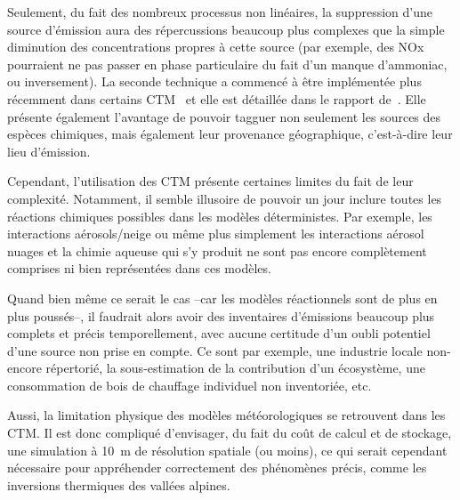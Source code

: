 Seulement, du fait des nombreux processus non linéaires, la suppression d'une source
d'émission aura des répercussions beaucoup plus complexes que la simple diminution des
concentrations propres à cette source (par exemple, des NOx pourraient ne pas passer en
phase particulaire du fait d'un manque d'ammoniac, ou inversement). 
La seconde technique a commencé à être implémentée plus récemment dans certains
CTM~\autocite{wangDevelopment2009,wagstromDevelopment2008,kranenburgSource2013,brandtContribution2013}
et elle est détaillée dans le rapport de~\cite{mirceaEuropean2020}. Elle présente également
l'avantage de pouvoir tagguer non seulement les sources des espèces chimiques, mais
également leur provenance géographique, c'est-à-dire leur lieu d'émission.

Cependant, l'utilisation des CTM présente certaines limites du fait de leur complexité.
Notamment, il semble illusoire de pouvoir un jour inclure toutes les réactions chimiques
possibles dans les modèles déterministes. Par exemple, les interactions aérosols/neige ou
même plus simplement les interactions aérosol nuages et la chimie aqueuse qui s'y produit
ne sont pas encore complètement comprises ni bien représentées dans ces modèles.

Quand bien même ce serait le cas --car les modèles réactionnels sont de plus en plus
poussés--, il faudrait alors avoir des inventaires d'émissions beaucoup plus complets et
précis temporellement, avec aucune certitude d'un oubli potentiel d'une source non prise
en compte. Ce sont par exemple, une industrie locale non-encore répertorié, la sous-estimation de
la contribution d'un écosystème, une consommation de bois de chauffage individuel non
inventoriée, etc.

Aussi, la limitation physique des modèles météorologiques se retrouvent dans les CTM. Il
est donc compliqué d'envisager, du fait du coût de calcul et de stockage, une simulation à
\SI{10}{\m} de résolution spatiale (ou moins), ce qui serait cependant nécessaire pour
appréhender correctement des phénomènes précis, comme les inversions thermiques des
vallées alpines.

